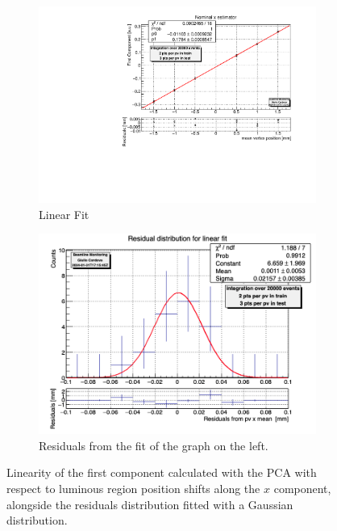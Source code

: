 \begin{figure}
    \centering
    \begin{subfigure}{0.48\textwidth}
    \includegraphics[width=\linewidth]{figures/x_fit_MC.pdf}
    \caption{Linear Fit}\label{fig:xfit_MC}
    \end{subfigure}
    \begin{subfigure}{0.48\textwidth}
    \includegraphics[width=\linewidth]{figures/x_res_MC.png}
    \caption{Residuals from the fit of the graph on the left. }\label{fig:xres_MC}
    \end{subfigure}
    \caption{Linearity of the first component calculated with the PCA with respect to luminous region position shifts along the $x$ component, alongside the residuals distribution fitted with a Gaussian distribution.}
    \label{fig:x_MC}
\end{figure}


